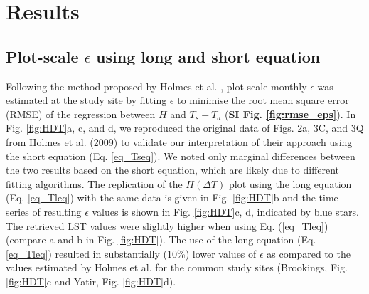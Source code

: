 \documentclass[fleqn,10pt]{wlscirep}
\begin{document}
\section{Results}

\subsection{Plot-scale $\epsilon$ using long and short equation}

Following the method proposed by Holmes et al. \cite{holmes_land_2009, holmes_cloud_2016}, plot-scale monthly $\epsilon$ was estimated at the study site by fitting $\epsilon$ to minimise the root mean square error (RMSE) of the regression between $H$ and $T_s - T_a$ (\textbf{SI Fig. \ref{fig:rmse_eps}}). In Fig. \ref{fig:HDT}a, c, and d, we reproduced the original data of Figs. 2a, 3C, and 3Q from Holmes et al. (2009) \cite{holmes_land_2009} to validate our interpretation of their approach using the short equation (Eq. \ref{eq_Tseq}). We noted only marginal differences between the two results based on the short equation, which are likely due to different fitting algorithms. 
The replication of the $H (\Delta T)$ plot using the long equation (Eq. \ref{eq_Tleq}) with the same data is given in Fig. \ref{fig:HDT}b and the time series of resulting $\epsilon$ values is shown in Fig. \ref{fig:HDT}c, d, indicated by blue stars. The retrieved LST values were slightly higher when using Eq. (\ref{eq_Tleq}) (compare a and b in Fig. \ref{fig:HDT}). The use of the long equation (Eq. \ref{eq_Tleq}) resulted in substantially (10\%) lower values of $\epsilon$ as compared to the values estimated by Holmes et al.\cite{holmes_land_2009} for the common study sites (Brookings, Fig. \ref{fig:HDT}c and Yatir, Fig. \ref{fig:HDT}d). 
\end{document}
